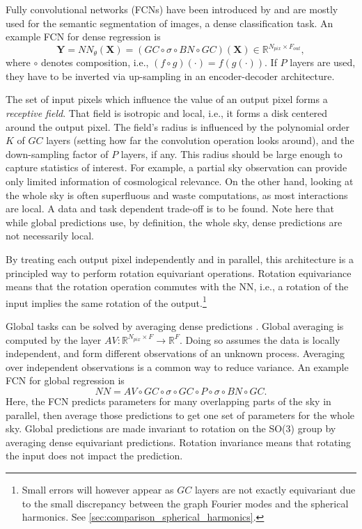\documentclass[final,twocolumn,3p,times,sort&compress]{elsarticle}
\renewcommand{\b}[1]{{\bm{#1}}}   %
\newcommand{\1}{\b{1}}              %
\newcommand{\0}{\b{0}}              %
\newcommand{\X}{\b{X}}
\newcommand{\Y}{\b{Y}}
\newcommand{\R}{\mathbb{R}}
\begin{document}
Fully convolutional networks (FCNs) have been introduced by  \citep{long2015fcn} and are mostly used for the semantic segmentation of images, a dense classification task.
An example FCN for dense regression is
\begin{equation*}
	\Y = NN_\theta(\X) = (GC \circ \sigma \circ BN \circ GC)(\X) \in \R^{N_{pix} \times F_{out}},
\end{equation*}
where $\circ$ denotes composition, i.e., $(f \circ g)(\cdot) = f(g(\cdot))$.
If $P$ layers are used, they have to be inverted via up-sampling in an encoder-decoder architecture.

The set of input pixels which influence the value of an output pixel forms a \textit{receptive field}.
That field is isotropic and local, i.e., it forms a disk centered around the output pixel.
The field's radius is influenced by the polynomial order $K$ of $GC$ layers (setting how far the convolution operation looks around), and the down-sampling factor of $P$ layers, if any.
This radius should be large enough to capture statistics of interest.
For example, a partial sky observation can provide only limited information of cosmological relevance.
On the other hand, looking at the whole sky is often superfluous and waste computations, as most interactions are local.
A data and task dependent trade-off is to be found.
Note here that while global predictions use, by definition, the whole sky, dense predictions are not necessarily local.

By treating each output pixel independently and in parallel, this architecture is a principled way to perform rotation equivariant operations.
Rotation equivariance means that the rotation operation commutes with the NN, i.e., a rotation of the input implies the same rotation of the output.\footnote{Small errors will however appear as $GC$ layers are not exactly equivariant due to the small discrepancy between the graph Fourier modes and the spherical harmonics. See \ref{sec:comparison_spherical_harmonics}.}

Global tasks can be solved by averaging dense predictions \citep{lin2013globalavgpooling, springenberg2014allconv}.
Global averaging is computed by the layer $AV: \R^{N_{pix} \times F} \rightarrow \R^F$.
Doing so assumes the data is locally independent, and form different observations of an unknown process.
Averaging over independent observations is a common way to reduce variance.
An example FCN for global regression is
\begin{equation*}
	NN = AV \circ GC \circ \sigma \circ GC \circ P \circ \sigma \circ BN \circ GC.
\end{equation*}
Here, the FCN predicts parameters for many overlapping parts of the sky in parallel, then average those predictions to get one set of parameters for the whole sky.
Global predictions are made invariant to rotation on the SO(3) group by averaging dense equivariant predictions.
Rotation invariance means that rotating the input does not impact the prediction.
\end{document}
